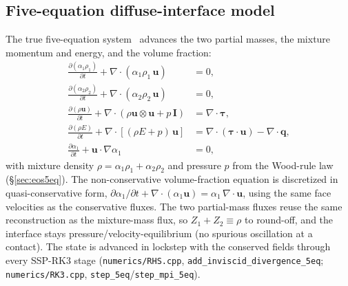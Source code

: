 \documentclass[11pt]{article}
\newcommand{\dpar}[2]{\frac{\partial #1}{\partial #2}}
\newcommand{\uvec}{\mathbf{u}}
\newcommand{\code}[1]{\texttt{#1}}
\begin{document}
\subsection{Five-equation diffuse-interface model}
\label{sec:fiveeq}
The true five-equation system~\cite{allaire_2002,kapila_2001} advances the two
partial masses, the mixture momentum and energy, and the volume fraction:
\begin{align}
\dpar{(\alpha_1\rho_1)}{t} + \nabla\!\cdot(\alpha_1\rho_1\,\uvec) &= 0, \\
\dpar{(\alpha_2\rho_2)}{t} + \nabla\!\cdot(\alpha_2\rho_2\,\uvec) &= 0, \\
\dpar{(\rho\uvec)}{t} + \nabla\!\cdot\!\left(\rho\uvec\otimes\uvec + p\,\mathbf{I}\right)
   &= \nabla\!\cdot\boldsymbol{\tau}, \\
\dpar{(\rho E)}{t} + \nabla\!\cdot\!\left[(\rho E + p)\,\uvec\right]
   &= \nabla\!\cdot(\boldsymbol{\tau}\cdot\uvec) - \nabla\!\cdot\mathbf{q}, \\
\dpar{\alpha_1}{t} + \uvec\cdot\nabla\alpha_1 &= 0,
\end{align}
with mixture density $\rho = \alpha_1\rho_1 + \alpha_2\rho_2$ and pressure $p$
from the Wood-rule law (\S\ref{sec:eos5eq}). The non-conservative volume-fraction
equation is discretized in quasi-conservative form,
$\partial\alpha_1/\partial t + \nabla\!\cdot(\alpha_1\uvec) = \alpha_1\,\nabla\!\cdot\uvec$,
using the same face velocities as the conservative fluxes. The two partial-mass
fluxes reuse the same reconstruction as the mixture-mass flux, so $Z_1+Z_2\equiv
\rho$ to round-off, and the interface stays pressure/velocity-equilibrium
(no spurious oscillation at a contact). The state is advanced in lockstep with
the conserved fields through every SSP-RK3 stage
(\code{numerics/RHS.cpp}, \code{add\_inviscid\_divergence\_5eq};
\code{numerics/RK3.cpp}, \code{step\_5eq}/\code{step\_mpi\_5eq}).
\end{document}
